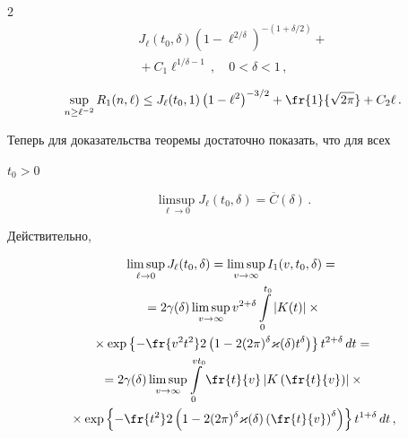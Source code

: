\begin{multicols}{2}
\begin{multline*}
J_\ell(t_0,\delta)\left(1-\ell^{2/\delta}\right)^{-(1+\delta/2)}+{}\\


{}+


C_1\ell^{1/\delta-1}\,,\quad 0<\delta<1\,,


\end{multline*}


$$


\sup_{n\ge\ell^{-2}}R_1(n,\ell)\le


J_\ell(t_0,1)\left(1-\ell^2\right)^{-3/2} +\fr{1}{\sqrt{2\pi}}+


C_2\ell\,.


$$


Теперь для доказательства теоремы достаточно показать, что для всех


$t_0>0$


$$


\limsup_{\ell\to0}J_\ell(t_0,\delta)=\overline C(\delta)\,.


$$


Действительно,


\begin{multline*}


\limsup_{\ell\to 0}J_\ell(t_0,\delta)= \limsup_{v\to\infty}


I_1(v,t_0,\delta)={}


\\


{}


=2\gamma(\delta)\limsup_{v\to\infty}v^{2+\delta}\int\limits_0^{t_0}|K(t)|\times{}\\


{}\times


\exp\left\{-\fr{v^2t^2}2 \left(1-2(2\pi)^\delta\varkappa(\delta)t^{\delta}


\right)\right\} t^{2+\delta}\,dt={}\\


{}


=2\gamma(\delta)\limsup_{v\to\infty}\int\limits_0^{vt_0}


\fr{t}{v}\left|K\left(\fr{t}{v}\right)\right| \times{}\\


{}\times


\exp\left\{-\fr{t^2}2


\left(1-2(2\pi)^\delta\varkappa(\delta)\left(\fr{t}{v}\right)^{\delta}


\right)\right\} t^{1+\delta}\,dt\,,


\end{multline*}



\end{multicols}
